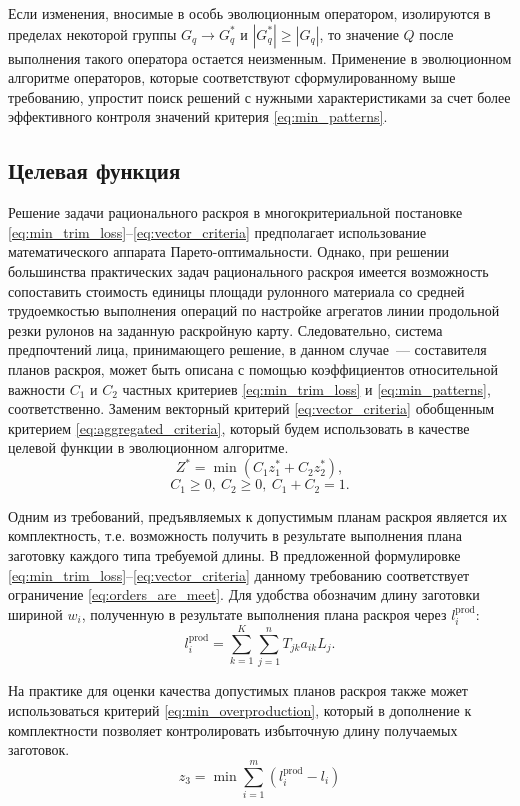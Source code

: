 \documentclass[12pt]{article}
\begin{document}
Если изменения, вносимые в особь эволюционным оператором, изолируются в 
пределах некоторой группы $G_q \rightarrow G_q^*$ и $|G_q^*| \geq |G_q|$, то 
значение $Q$ после выполнения такого оператора остается неизменным. Применение 
в эволюционном алгоритме операторов, которые соответствуют сформулированному 
выше требованию, упростит поиск решений с нужными характеристиками за счет 
более эффективного контроля значений критерия 
\eqref{eq:min_patterns}.

\subsection{Целевая функция}

Решение задачи рационального раскроя в многокритериальной постановке 
\eqref{eq:min_trim_loss}--\eqref{eq:vector_criteria}
предполагает использование математического аппарата Парето-оптимальности. 
Однако, при решении большинства практических задач рационального раскроя 
имеется возможность сопоставить стоимость единицы площади рулонного материала 
со средней трудоемкостью выполнения операций по настройке агрегатов линии 
продольной резки рулонов на заданную раскройную карту. Следовательно, система 
предпочтений лица, принимающего решение, в данном случае~--- составителя планов 
раскроя, может быть описана с помощью коэффициентов относительной важности 
$C_1$ и $C_2$ частных критериев 
\eqref{eq:min_trim_loss} и 
\eqref{eq:min_patterns}, 
соответственно. Заменим векторный 
критерий 
\eqref{eq:vector_criteria}
обобщенным критерием 
\eqref{eq:aggregated_criteria}, 
который будем использовать в качестве 
целевой функции в эволюционном алгоритме.
\begin{equation}\label{eq:aggregated_criteria}
    Z^*=\min{(C_1z_1^*+C_2z_2^*)},
\end{equation}
\[C_1 \geq 0, \: C_2 \geq 0, \: C_1+C_2=1.\]

Одним из требований, предъявляемых к допустимым планам раскроя является их 
комплектность, т.е. возможность получить в результате выполнения плана 
заготовку каждого типа требуемой длины. В предложенной формулировке 
\eqref{eq:min_trim_loss}--\eqref{eq:vector_criteria}
данному требованию соответствует ограничение 
\eqref{eq:orders_are_meet}. 
Для удобства обозначим длину 
заготовки шириной $w_i$, полученную в результате выполнения плана раскроя 
через $l_i^{\text{prod}}$:
\[ l_i^{\text{prod}}=\sum_{k=1}^{K} \sum_{j=1}^{n} T_{jk}a_{ik}L_j. \]

На практике для оценки качества допустимых планов раскроя также может 
использоваться критерий 
\eqref{eq:min_overproduction}, 
который в дополнение к комплектности позволяет 
контролировать избыточную длину получаемых заготовок.
\begin{equation}\label{eq:min_overproduction}
    z_3=\min{\sum_{i=1}^{m} \left( l_i^{\text{prod}}-l_i \right)}
\end{equation}
\end{document}
